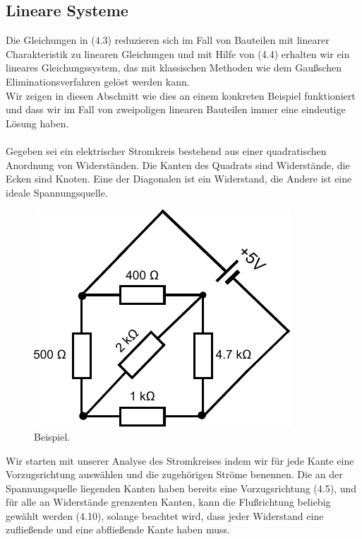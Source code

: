 \documentclass[11pt,a4paper,leqno]{report}
\numberwithin{equation}{chapter}
\begin{document}
\subsection{Lineare Systeme}
Die Gleichungen in (4.3) reduzieren sich im Fall von Bauteilen mit linearer Charakteristik zu linearen Gleichungen und mit Hilfe von (4.4) erhalten wir ein lineares Gleichungssystem, das mit klassischen Methoden wie dem Gau\ss{}schen Eliminationsverfahren gel\"ost werden kann. \\Wir zeigen in diesen Abschnitt wie dies an einem konkreten Beispiel funktioniert und dass wir im Fall von zweipoligen linearen Bauteilen immer eine eindeutige L\"osung haben.\\
\\
Gegeben sei ein elektrischer Stromkreis bestehend aus einer quadratischen Anordnung von Widerst\"anden. Die Kanten des Quadrats sind Widerst\"ande, die Ecken sind Knoten. Eine der Diagonalen ist ein Widerstand, die Andere ist eine ideale Spannungsquelle.
\begin{figure}[H]
	\begin{center}
		\includegraphics[scale=0.8]{stromkreis_1.pdf}
		\caption{Beispiel.}
	\end{center}
\end{figure}
\noindent
Wir starten mit unserer Analyse des Stromkreises indem wir f\"ur jede Kante eine Vorzugsrichtung ausw\"ahlen und die zugeh\"origen Str\"ome benennen. Die an der Spannungsquelle liegenden Kanten haben bereits eine Vorzugsrichtung (4.5), und f\"ur alle an Widerst\"ande grenzenten Kanten, kann die Flu\ss{}richtung beliebig gew\"ahlt werden (4.10), solange beachtet wird, dass jeder Widerstand eine zuflie\ss{}ende und eine abflie\ss{}ende Kante haben muss.
\end{document}

